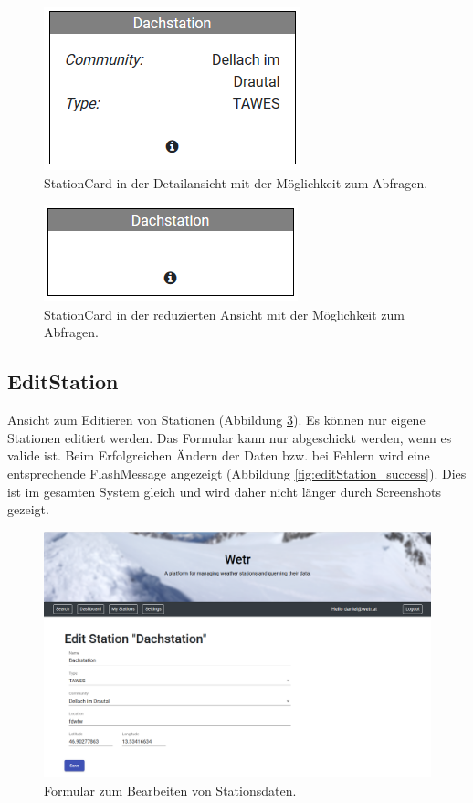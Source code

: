 \documentclass[12pt, letterpaper]{article}
\begin{document}
\begin{figure}[H]
    \centering
    \includegraphics[scale=1.0]{img/stations/search_detail.png}
    \caption{StationCard in der Detailansicht mit der Möglichkeit zum Abfragen.}
    \label{fig:search_detail}
\end{figure}

\begin{figure}[H]
    \centering
    \includegraphics[scale=1.0]{img/stations/search.png}
    \caption{StationCard in der reduzierten Ansicht mit der Möglichkeit zum Abfragen.}
    \label{fig:search_normal}
\end{figure}
\newpage


\subsection{EditStation}
\label{editStation}
Ansicht zum Editieren von Stationen (Abbildung \ref{fig:editStation}). Es können nur eigene Stationen editiert werden. Das Formular kann nur abgeschickt werden, wenn es valide ist. Beim Erfolgreichen Ändern der Daten bzw. bei Fehlern wird eine entsprechende FlashMessage angezeigt (Abbildung \ref{fig:editStation_success}). Dies ist im gesamten System gleich und wird daher nicht länger durch Screenshots gezeigt.

\begin{figure}[H]
    \centering
    \includegraphics[width=\textwidth]{img/edit/edit_station.png}
    \caption{Formular zum Bearbeiten von Stationsdaten.}
    \label{fig:editStation}
\end{figure}
\end{document}
